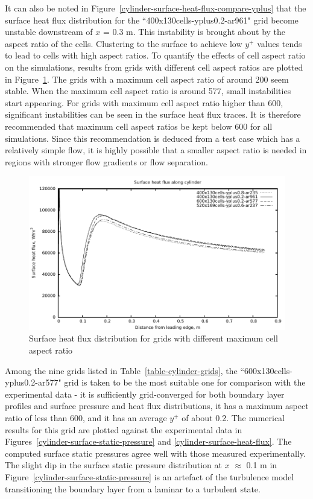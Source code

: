 It can also be noted in Figure~\ref{cylinder-surface-heat-flux-compare-yplus} that 
the surface heat flux distribution for the ``400x130cells-yplus0.2-ar961" grid 
become unstable downstream of $x$ = 0.3 m. This instability is brought about by 
the aspect ratio of the cells. Clustering to the surface to achieve low
$y^+$ values tends to lead to cells with high aspect ratios. To quantify the
effects of cell aspect ratio on the simulations, results from grids with different
cell aspect ratios are plotted in Figure~\ref{cylinder-surface-heat-flux-compare-aspect-ratio}.
The grids with a maximum cell aspect ratio of around 200 seem stable. When the 
maximum cell aspect ratio is around 577, small instabilities start appearing. For
grids with maximum cell aspect ratio higher than 600, significant instabilities
can be seen in the surface heat flux traces. It is therefore recommended that
maximum cell aspect ratios be kept below 600 for all simulations. Since this
recommendation is deduced from a test case which has a relatively simple flow,
it is highly possible that a smaller aspect ratio is needed in regions with 
stronger flow gradients or flow separation.
%
\begin{figure}[h]
 \begin{center}
  \includegraphics[width=15cm]{./chap3-mallinson-cylinder/figs/compare-aspect-ratio-heat-flux.pdf}
 \end{center}
 \caption{Surface heat flux distribution for grids with different maximum cell aspect ratio}
 \label{cylinder-surface-heat-flux-compare-aspect-ratio}
\end{figure}

Among the nine grids listed in Table~\ref{table-cylinder-grids}, the 
``600x130cells-yplus0.2-ar577" grid is taken to be the most suitable
one for comparison with the experimental data - it is sufficiently 
grid-converged for both boundary layer profiles and surface pressure 
and heat flux distributions, it has a maximum aspect ratio of less
than 600, and it has an average $y^+$ of about 0.2. The numerical results
for this grid are plotted against the experimental data in 
Figures~\ref{cylinder-surface-static-pressure} and \ref{cylinder-surface-heat-flux}.
The computed surface static pressures agree well with those measured experimentally. 
The slight dip in the surface static pressure distribution at $x$ $\approx$ 0.1 m 
in Figure~\ref{cylinder-surface-static-pressure} is an artefact of the 
turbulence model transitioning the boundary layer from a laminar to a turbulent 
state. 

